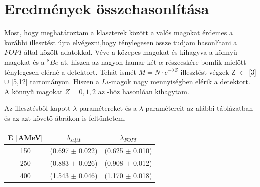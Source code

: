 \documentclass[a4paper,12pt]{article}
\begin{document}
\section{ Eredmények összehasonlítása}

\vspace{5mm}

\par Most, hogy meghatároztam a klaszterek között a valós magokat érdemes a korábbi illesztést újra elvégezni,hogy ténylegesen össze tudjam hasonlítani a $FOPI$ által közölt adatokkal. Véve a közepes magokat és kihagyva a könnyű magokat és a $^{8}Be$-at, hiszen az nagyon hamar két $\alpha$-részecskére bomlik mielőtt ténylegesen elérné a detektort. Tehát ismét $M = N\cdot e^{-\lambda Z}$ illesztést végzek Z $\in$ [3] $\cup$ [5,12] tartományon. Hiszen a $Li$-magok nagy mennyiségben elérik a detektort. A könnyű magokat $Z = 0, 1, 2$ az \cite{REISDORF1997493}-höz hasonlóan kihagytam. 

\vspace{5mm}

\par Az illesztésből kapott $\lambda$ paramétereket és a \cite{REISDORF1997493} $\lambda$ paramétereit az alábbi táblázatban és az azt követő ábrákon is feltüntetem.

\vspace{5mm}

\begin{center}
\begin{tabular}{|c|c|c|}
\hline
E [AMeV] & $\lambda_{\text{saját}}$ & $\lambda_{FOPI}$ \\
\hline
150 & (0.697 $\pm$ 0.022) & (0.625 $\pm$ 0.010)\\
\hline
250  & (0.883 $\pm$ 0.026) & (0.908 $\pm$ 0.012)\\
\hline
400 & (1.543 $\pm$ 0.046) & (1.170 $\pm$ 0.018) \\
\hline
\end{tabular}
\end{center}

\vspace{5mm}
\end{document}
